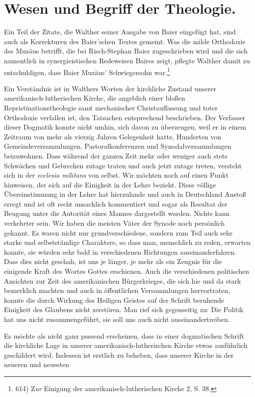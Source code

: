 \section*{Wesen und Begriff der Theologie.}

Ein Teil der Zitate, die Walther seiner Ausgabe von Baier eingefügt hat, sind auch als Korrekturen des Baier'schen Textes gemeint. Was \glqq die milde Orthodoxie des Muzäus\grqq{} betrifft, die bei Risch-Stephan Baier zugeschrieben wird und die sich namentlich in synergieistischen Redeweisen Baires zeigt, pflegte Walther damit zu entschuldigen, dass Baier Muzäus' Schwiegersohn war.\footnote{614) Z\textit{ur} Einigung der amerikanisch-lutherischen Kirche 2, S. 38.}

Ein Verständnis ist in Walthers Worten der kirchliche Zustand unserer amerikanisch-lutherischen Kirche, die angeblich einer bloßen \glqq Repristinationstheologie\grqq{} samt \glqq mechanischer Christauffassung\grqq{} und \glqq toter Orthodoxie\grqq{} verfallen ist, den Tatsachen entsprechend beschrieben. Der Verfasser dieser Dogmatik konnte nicht umhin, sich davon zu überzeugen, weil er in einem Zeitraum von mehr als vierzig Jahren Gelegenheit hatte, Hunderten von Gemeindeversammlungen, Pastoralkonferenzen und Synodalversammlungen beizuwohnen. Dass während der ganzen Zeit mehr oder weniger auch stets Schwächen und Gebrechen zutage traten und auch jetzt zutage treten, versteht sich in der \textit{ecclesia militans} von selbst. Wir möchten noch auf einen Punkt hinweisen, der sich auf die Einigkeit in der Lehre bezieht. Diese völlige Übereinstimmung in der Lehre hat hierzulande und auch in Deutschland Anstoß erregt und ist oft recht unsachlich kommentiert und sogar als Resultat der Beugung unter die Autorität eines Mannes dargestellt worden. Nichts kann verkehrter sein. Wir haben die meisten Väter der Synode noch persönlich gekannt. Es waren nicht nur grundverschiedene, sondern zum Teil auch sehr starke und selbstständige Charaktere, so dass man, menschlich zu reden, erwarten konnte, sie würden sehr bald in verschiedenen Richtungen auseinanderfahren. Dass dies nicht geschah, ist uns je länger, je mehr als ein Zeugnis für die einigende Kraft des Wortes Gottes erschienen. Auch die verschiedenen politischen Ansichten zur Zeit des amerikanischen Bürgerkrieges, die sich hie und da stark bemerklich machten und auch in öffentlichen Versammlungen hervortraten, konnte die durch Wirkung des Heiligen Geistes auf der Schrift beruhende Einigkeit des Glaubens nicht zerstören. Man rief sich gegenseitig zu: \glqq Die Politik hat uns nicht zusammengeführt, sie soll uns auch nicht auseinandertreiben.\grqq{}

Es möchte als nicht ganz passend erscheinen, dass in einer dogmatischen Schrift die kirchliche Lage in unserer amerikanisch-lutherischen Kirche etwas ausführlich geschildert wird. Indessen ist erstlich zu beheben, dass unserer Kirche in der neueren und neuesten